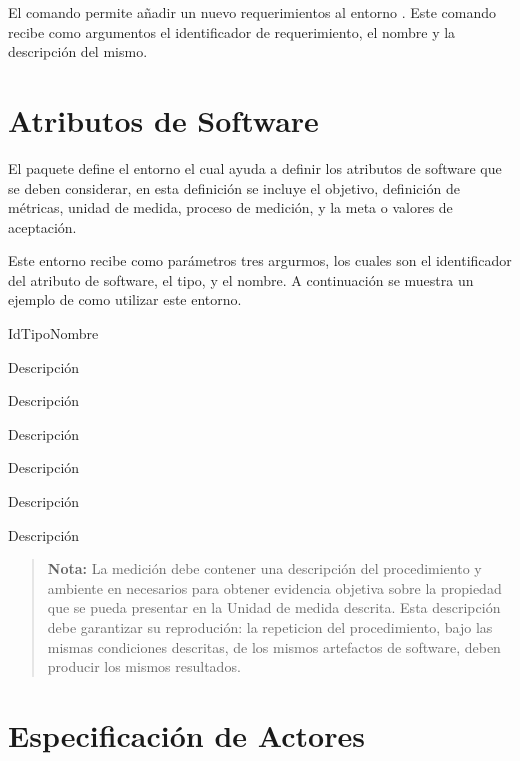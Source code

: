 \noindent El comando  permite añadir un nuevo requerimientos al entorno . Este comando recibe como argumentos el identificador de requerimiento, el nombre y la descripción del mismo.

    \begin{code}
    \end{code}


\section{Atributos de Software}

El paquete define el entorno  el cual ayuda a definir los atributos de software que se deben considerar, en esta definición se incluye el objetivo, definición de métricas, unidad de medida, proceso de medición, y la meta o valores de aceptación.
\clearpage

\noindent Este entorno recibe como parámetros tres argurmos, los cuales son el identificador del atributo de software, el tipo, y el nombre. A continuación se muestra un ejemplo de como utilizar este entorno.

    \begin{code}
\begin{atributoDeSoftware}{Id}{Tipo}{Nombre}
    \item[Objetivo:] Descripción
    \item[Definición:] Descripción
    \item[Métrica:] Descripción
    \item[Unidad de medida:] Descripción
    \item[Medición:] Descripción
    \item[Meta:] Descripción
\end{atributoDeSoftware}
    \end{code}

\begin{quote}
{\bf Nota:} La medición debe contener una descripción del procedimiento y ambiente en necesarios para obtener evidencia objetiva sobre la propiedad que se pueda presentar en la Unidad de medida descrita. Esta descripción debe garantizar su reprodución: la repeticion del procedimiento, bajo las mismas condiciones descritas, de los mismos artefactos de software, deben producir los mismos resultados.
\end{quote}



\section{Especificación de Actores}

